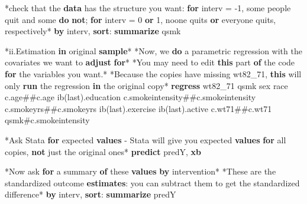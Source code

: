 \documentclass[
  10pt,
]{book}
\newenvironment{Shaded}{\begin{snugshade}}{\end{snugshade}}
\newcommand{\FunctionTok}[1]{\textcolor[rgb]{0.00,0.00,0.00}{#1}}
\newcommand{\KeywordTok}[1]{\textcolor[rgb]{0.13,0.29,0.53}{\textbf{#1}}}
\newcommand{\NormalTok}[1]{#1}
\newcommand{\OtherTok}[1]{\textcolor[rgb]{0.56,0.35,0.01}{#1}}
\begin{document}
\begin{Shaded}
\begin{Highlighting}[]
\NormalTok{*check that the }\KeywordTok{data}\NormalTok{ has the structure you want: }\KeywordTok{for}\NormalTok{ interv = {-}1, some people quit and some }\KeywordTok{do} \KeywordTok{not}\NormalTok{; }\KeywordTok{for}\NormalTok{ interv = 0 }\KeywordTok{or}\NormalTok{ 1, noone quits }\KeywordTok{or}\NormalTok{ everyone quits, respectively*}
\KeywordTok{by}\NormalTok{ interv, }\KeywordTok{sort}\NormalTok{: }\KeywordTok{summarize}\NormalTok{ qsmk}

\NormalTok{*ii.Estimation }\KeywordTok{in}\NormalTok{ original }\KeywordTok{sample}\NormalTok{*}
\NormalTok{*Now, we }\KeywordTok{do}\NormalTok{ a parametric regression with the covariates we want to }\KeywordTok{adjust} \KeywordTok{for}\NormalTok{*}
\NormalTok{*You may need to edit }\KeywordTok{this}\NormalTok{ part }\KeywordTok{of}\NormalTok{ the code }\KeywordTok{for}\NormalTok{ the variables you want.*}
\NormalTok{*Because the copies have }\FunctionTok{missing}\NormalTok{ wt82\_71, }\KeywordTok{this}\NormalTok{ will only }\KeywordTok{run}\NormalTok{ the regression }\KeywordTok{in}\NormalTok{ the original copy*}
\KeywordTok{regress}\NormalTok{ wt82\_71 qsmk sex race c.age\#\#c.age ib(}\FunctionTok{last}\NormalTok{).education c.smokeintensity\#\#c.smokeintensity c.smokeyrs\#\#c.smokeyrs ib(}\FunctionTok{last}\NormalTok{).exercise ib(}\FunctionTok{last}\NormalTok{).active c.wt71\#\#c.wt71 qsmk\#c.smokeintensity}

\NormalTok{*Ask Stata }\KeywordTok{for}\NormalTok{ expected }\KeywordTok{values}\NormalTok{ {-} Stata will give you expected }\KeywordTok{values} \KeywordTok{for} \OtherTok{all}\NormalTok{ copies, }\KeywordTok{not}\NormalTok{ just the original ones*}
\KeywordTok{predict}\NormalTok{ predY, }\KeywordTok{xb}

\NormalTok{*Now ask }\KeywordTok{for}\NormalTok{ a summary }\KeywordTok{of}\NormalTok{ these }\KeywordTok{values} \KeywordTok{by}\NormalTok{ intervention*}
\NormalTok{*These are the standardized outcome }\KeywordTok{estimates}\NormalTok{: you can subtract them to }\FunctionTok{get}\NormalTok{ the standardized difference*}
\KeywordTok{by}\NormalTok{ interv, }\KeywordTok{sort}\NormalTok{: }\KeywordTok{summarize}\NormalTok{ predY}


\end{Highlighting}
\end{Shaded}
\end{document}
